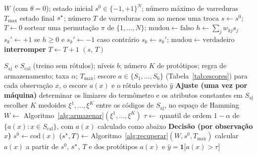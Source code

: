 \begin{algorithm}[htbp]
\caption{Recuperação assíncrona (rede clássica).}\label{alg:recuperar}
\begin{algorithmic}[1]
\Require $W$ (com $\theta=0$); estado inicial $s^0\in\{-1,+1\}^N$; número máximo de varreduras $T_{\max}$
\Ensure estado final $s^{\ast}$; número $T$ de varreduras com ao menos uma troca
\State $s\gets s^0$; \quad $T\gets0$
  \State sortear uma permutação $\pi$ de $\{1,\dots,N\}$; \quad $\mathrm{mudou}\gets\text{falso}$
    \State $h\gets\sum_{j}w_{kj}s_j$
    \State $s_k'\gets+1$ se $h\ge0$ e $s_k'\gets-1$ caso contrário 
      \State $s_k\gets s_k'$; \quad $\mathrm{mudou}\gets\text{verdadeiro}$
    \EndIf
  \EndFor
    \State \textbf{interromper}
  \EndIf
  \State $T\gets T+1$
\EndFor
\State \Return $(s,\,T)$
\end{algorithmic}
\end{algorithm}

\begin{algorithm}[htbp]
\caption{Detector \emph{one-class} com a rede de Hopfield clássica.}\label{alg:detectar}
\begin{algorithmic}[1]
\Require $S_{\mathrm{aj}}$ e $S_{\mathrm{cal}}$ (treino sem rótulos); níveis $b$; número $K$ de protótipos;
regra de armazenamento; taxa $\alpha$; $T_{\max}$; escore $a\in\{S_1,\dots,S_6\}$ (Tabela~\ref{tab:escores})
\Ensure para cada observação $x$, o escore $a(x)$ e o rótulo previsto $\hat y$
\Statex \textbf{Ajuste (uma vez por máquina)}
\State determinar os limiares do termômetro e os atributos constantes em $S_{\mathrm{aj}}$
\State escolher $K$ medoides $\xi^1,\dots,\xi^K$ entre os códigos de $S_{\mathrm{aj}}$, no espaço de Hamming
\State $W\gets$ Algoritmo~\ref{alg:armazenar}$(\xi^1,\dots,\xi^K)$
\State $\tau\gets$ quantil de ordem $1-\alpha$ de $\{a(x):x\in S_{\mathrm{cal}}\}$, com $a(x)$ calculado como abaixo
\Statex \textbf{Decisão (por observação $x$)}
\State $s^0\gets\mathrm{cod}(x)$
\State $(s^{\ast},T)\gets$ Algoritmo~\ref{alg:recuperar}$(W,s^0,T_{\max})$
\State calcular $a(x)$ a partir de $s^0$, $s^{\ast}$, $T$ e dos protótipos
\State \Return $a(x)$ e $\hat y=\mathbf 1\bigl[a(x)>\tau\bigr]$
\end{algorithmic}
\end{algorithm}

